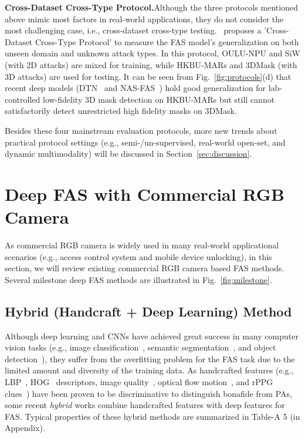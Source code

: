 \documentclass[10pt,journal,compsoc]{IEEEtran}
\begin{document}
\noindent\textbf{Cross-Dataset Cross-Type Protocol.}\quad Although the three protocols mentioned above mimic most factors in real-world applications, they do not consider the most challenging case, i.e., cross-dataset cross-type testing.~\cite{yu2020fas2} proposes a 'Cross-Dataset Cross-Type Protocol' to measure the FAS model's generalization on both unseen domain and unknown attack types.
In this protocol, OULU-NPU and SiW (with 2D attacks) are mixed for training, while HKBU-MARs and 3DMask (with 3D attacks) are used for testing. It can be seen from Fig.~\ref{fig:protocols}(d) that recent deep models (DTN~\cite{liu2019deep} and NAS-FAS~\cite{yu2020fas2}) hold good generalization for lab-controlled low-fidelity 3D mask detection on HKBU-MARs but still cannot satisfactorily detect unrestricted high fidelity masks on 3DMask.


Besides these four mainstream evaluation protocols, more new trends about practical protocol settings (e.g., semi-/un-supervised, real-world open-set, and dynamic multimodality) will be discussed in Section~\ref{sec:discussion}. 




\section{Deep FAS with Commercial RGB Camera} \label{sec:RGB}
As commercial RGB camera is widely used in many real-world applicational scenarios (e.g., access control system and mobile device unlocking), in this section, we will review existing commercial RGB camera based FAS methods. Several
milestone deep FAS methods are illustrated in Fig.~\ref{fig:milestone}. 


\subsection{Hybrid (Handcraft + Deep Learning) Method}
Although deep learning and CNNs have achieved great success in many computer vision tasks (e.g., image classification~\cite{He2015Deep,huang2017densely}, semantic segmentation~\cite{long2015fully}, and object detection~\cite{ren2016faster}), they suffer from the overfitting problem for the FAS task due to the limited amount and diversity of the training data. As handcrafted features (e.g., LBP~\cite{ahonen2006face}, HOG~\cite{dalal2005histograms} descriptors, image quality~\cite{galbally2014face}, optical flow motion~\cite{brox2010large}, and rPPG clues~\cite{niu2020video}) have been proven to be discriminative to distinguish bonafide from PAs, some recent \textit{hybrid} works combine handcrafted features with deep features for FAS. Typical properties of these hybrid methods are summarized in Table-A 5 (in Appendix).
\end{document}
